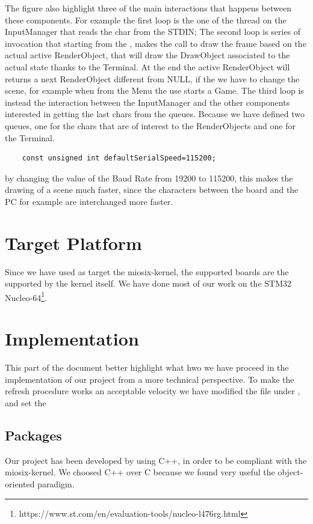 \documentclass{article}
\begin{document}
The figure also highlight three of the main interactions that happens between these components.
For example the first loop is the one of the thread on the InputManager that reads the char from the STDIN;
The second loop is series of invocation that starting from the \label{main-loop}, makes the call to draw the frame based on the actual active RenderObject, that will draw the DrawObject associated to the actual state thanks to the Terminal.
At the end the active RenderObject will returns a next RenderObject different from NULL, if the we have to change the scene, for example when from the Menu the use starts a Game.
The third loop is instead the interaction between the InputManager and the other components interested in getting the last chars from the queues. Because we have defined two queues, one for the chars that are of interest to the RenderObjects and one for the Terminal.
\begin{verbatim}
    const unsigned int defaultSerialSpeed=115200;
\end{verbatim}
by changing the value of the Baud Rate from 19200 to 115200, this makes the drawing of a scene much faster, since the characters between the board and the PC for example are interchanged more faster.

\section{Target Platform}
Since we have used as target the miosix-kernel, the supported boards are the supported by the kernel itself. We have done most of our work on the STM32 Nucleo-64\footnote{https://www.st.com/en/evaluation-tools/nucleo-l476rg.html}.

\section{Implementation}
This part of the document better highlight what hwo we have proceed in the implementation of our project from a more technical perspective.
To make the refresh procedure works an acceptable velocity we have modified the file under , and set the 

\subsection{Packages}
Our project has been developed by using C++\cite{slidec++}, in order to be compliant with the miosix-kernel\cite{miosix}.
We choosed C++ over C because we found very useful the object-oriented paradigm. 
\end{document}
